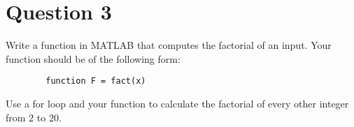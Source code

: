 \section{Question 3}

\begin{question}
    Write a function in MATLAB that computes the factorial of an input. Your function should be of the following form:
    \begin{verbatim}
        function F = fact(x)
    \end{verbatim}
    Use a for loop and your function to calculate the factorial of every other integer from $2$ to $20$.
\end{question}

\begin{answer}
    
\end{answer}